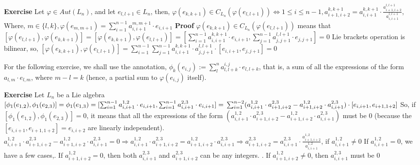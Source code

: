 \documentclass[12pt]{article}
\begin{document}
\newpage
\textbf{Exercise}
Let $\varphi \in Aut(L_n)$, and let $e_{l,l+1} \in L_n$, then, \newline
$\varphi(e_{k,k+1}) \in C_{L_n}(\varphi(e_{l,l+1})) \Leftrightarrow 1 \leq i \leq n-1,
a_{i+1,i+2}^{k,k+1}=a_{i,i+1}^{k,k+1} \cdot \frac{a_{i+1,i+2}^{l,l+1}}{a_{i,i+1}^{l,l+1}}$, \newline
Where, \newline
$m \in \{l,k\},\varphi(e_{m,m+1})=\sum_{i=1}^{n-1} a_{i,i+1}^{m,m+1} \cdot e_{i,i+1}$ \newline
\textbf{Proof} \newline
$\varphi(e_{k,k+1}) \in C_{L_n}(\varphi(e_{l,l+1}))$ means that $[\varphi(e_{l,l+1}),\varphi(e_{k,k+1})]=[\varphi(e_{k,k+1}),\varphi(e_{l,l+1})]=[\sum_{i=1}^{n-1} a_{i,i+1}^{k,k+1} \cdot e_{i,i+1},\sum_{j=1}^{n-1} a_{j,j+1}^{l,l+1} \cdot e_{j,j+1}]=0$ \newline
Lie brackets operation is bilinear, so, \newline
$[\varphi(e_{k,k+1}),\varphi(e_{l,l+1})]=\sum_{i=1}^{n-1} \sum_{j=1}^{n-1} a_{i,i+1}^{k,k+1} \cdot a_{j,j+1}^{l,l+1} \cdot [e_{i,i+1},e_{j,j+1}]=0$ \newline

For the following exercise, we shall use the annotation, \newline
$\phi_k(e_{i,j}):=\sum_l^n a_{l,l+k}^{i,j} \cdot e_{l,l+k}$, that is, a sum of all the expressions of the form $a_{l,m} \cdot e_{l,m}$, where $m-l=k$ (hence, a partial sum to $\varphi(e_{i,j})$ itself). \newline

\textbf{Exercise} \newline
Let $L_n$ be a Lie algebra \newline
$[\phi_1(e_{1,2}),\phi_1(e_{2,3})]=\phi_1(e_{1,3})=
[\sum_{i=1}^{n-1} a_{i,i+1}^{1,2} \cdot e_{i,i+1},\sum_{i=1}^{n-1} a_{i,i+1}^{2,3} \cdot e_{i,i+1}]= \newline
\sum_{i=1}^{n-2} (a_{i,i+1}^{1,2} \cdot a_{i+1,i+2}^{2,3}-a_{i+1,i+2}^{1,2} \cdot a_{i,i+1}^{2,3}) \cdot [e_{i,i+1},e_{i+1,1+2}]$ \newline
So, if $[\phi_1(e_{1,2}),\phi_1(e_{2,3})]=0$,
it means that all the expressions of the form $(a_{i,i+1}^{1,2} \cdot a_{i+1,i+2}^{2,3}-a_{i+1,i+2}^{1,2} \cdot a_{i,i+1}^{2,3})$ must be 0 (because the $[e_{i,i+1},e_{i+1,1+2}]=e_{i,i+2}$ are linearly independent). \newline
$a_{i,i+1}^{1,2} \cdot a_{i+1,i+2}^{2,3}-a_{i+1,i+2}^{1,2} \cdot a_{i,i+1}^{2,3}=0 \Rightarrow a_{i,i+1}^{1,2} \cdot a_{i+1,i+2}^{2,3}=a_{i+1,i+2}^{1,2} \cdot a_{i,i+1}^{2,3} \Rightarrow a_{i+1,i+2}^{2,3}=a_{i,i+1}^{2,3} \cdot \frac{a_{i+1,i+2}^{1,2}}{a_{i,i+1}^{1,2}}$, if $a_{i,i+1}^{1,2} \neq 0$ \newline
If $a_{i,i+1}^{1,2}=0$, we have a few cases,. If $a_{i+1,i+2}^{1,2}=0$, then both $a_{i,i+1}^{2,3}$ and $a_{i+1,i+2}^{2,3}$ can be any integers. . If $a_{i+1,i+2}^{1,2} \neq 0$, then $a_{i,i+1}^{2,3}$ must be $0$ \newline
\end{document}

